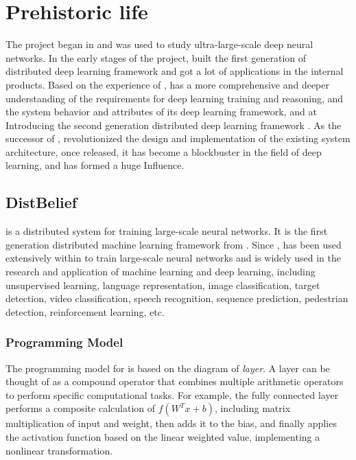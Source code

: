 \section{Prehistoric life}
\begin{content}
The  project began in  and was used to study ultra-large-scale deep neural networks. In the early stages of the project,  built the first generation of distributed deep learning framework  and got a lot of applications in the  internal products.
Based on the experience of ,  has a more comprehensive and deeper understanding of the requirements for deep learning training and reasoning, and the system behavior and attributes of its deep learning framework, and at  Introducing the second generation distributed deep learning framework \tf{}. \tf{} As the successor of , revolutionized the design and implementation of the existing system architecture, \tf{} once released, it has become a blockbuster in the field of deep learning, and has formed a huge Influence.


\subsection{DistBelief}
 is a distributed system for training large-scale neural networks. It is the first generation distributed machine learning framework from . Since ,  has been used extensively within  to train large-scale neural networks and is widely used in the research and application of machine learning and deep learning, including unsupervised learning, language representation, image classification, target detection, video classification, speech recognition, sequence prediction, pedestrian detection, reinforcement learning, etc.


\subsubsection{Programming Model}
The programming model for  is based on the  diagram of \emph{layer}. A layer can be thought of as a compound operator that combines multiple arithmetic operators to perform specific computational tasks. For example, the fully connected layer performs a composite calculation of $f({W^T}x + b)$, including matrix multiplication of input and weight, then adds it to the bias, and finally applies the activation function based on the linear weighted value, implementing a nonlinear transformation.



\end{content}

